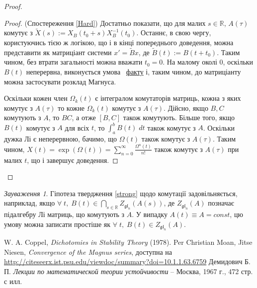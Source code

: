 \documentclass[14pt]{extarticle} %
\let\oldforall\forall
\renewcommand{\forall}{\oldforall\;}
\theoremstyle{remark}
\newtheorem{remark}{Зауваження}
\begin{document}
\begin{proof}
\begin{proof}{(Спостереження \ref{Hard})}
	Достатньо показати, що для малих $s\in\mathbb{R}$, $A(\tau)$ комутує з $\tilde{X}(s):=X_B(t_0+s)X_B^{-1}(t_0)$. Останнє, в свою чергу,
	користуючись тією ж логікою, що і в кінці попереднього доведення, можна представити як матриціант системи $x'=\tilde{B}x$, де
	$\tilde{B}(t):=B(t+t_0)$. Таким чином, без втрати загальності можна вважати $t_0=0$. На малому околі 0, оскільки $B(t)$ неперервна,
	виконується умова ~\hyperref[MagnusConvergenceFact]{факту} і, таким чином, до матриціанту можна застосувати розклад Магнуса. 
	
	Оскільки
	кожен член $\Omega_k(t)$ є інтегралом комутаторів матриць, кожна з яких комутує з $A(\tau)$ то кожне $\Omega_k(t)$ комутує з $A(\tau)$.
	Дійсно, якщо $B,C$ комутують з $A$, то $BC$, а отже $[B,C]$ також комутують. Більше того,
	якщо $B(t)$ комутує з $A$ для всіх $t$, то $\int_a^bB(t)\;dt$ також комутує з $A$. Оскільки дужка Лі є неперервною, бачимо, що
	$\Omega(t)$ також комутує з $A(\tau)$. Таким чином, $X(t)=\exp(\Omega(t))=\sum\limits_{n=0}^\infty
	\frac{\Omega^n(t)}{n!}$ також комутує з $A(\tau)$ при малих $t$, що і завершує доведення.
	\end{proof}
\end{proof}
\begin{remark}Гіпотеза
	твердження \ref{strong} щодо комутації
	задовільняється, наприклад, якщо $\forall t,\;B(t)\in\bigcap\limits_{s\in\mathbb{R}} Z_{\mathfrak{gl}_n}(A(s))$, де
	$Z_{\mathfrak{gl}_n}(A)$ позначає підалгебру Лі матриць, що комутують з $A$. У випадку $A(t)\equiv A=const$, цю умову
можна записати простіше як $\forall t,\;B(t)\in Z_{\mathfrak{gl}_n}(A)$.\end{remark}
\begin{thebibliography}{9}
	W. A. Coppel, {\em Dichotomies in Stability Theory} (1978).
	Per Christian Moan, Jitse Niesen, {\em Convergence of the Magnus series}, доступна на 
	\url{http://citeseerx.ist.psu.edu/viewdoc/summary?doi=10.1.1.63.6759}
Демидович Б. П. \emph{Лекции по математической теории устойчивости} --
Москва, 1967 г., 472 стр. с илл.
\end{thebibliography}
\end{document}
